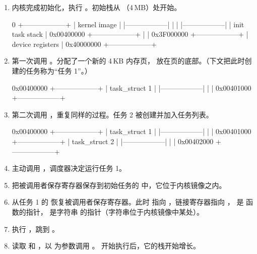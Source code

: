 \begin{enumerate}
  \item 内核完成初始化，执行 。初始栈从 （4\,MB）处开始。
\begin{txtcode}
         0 +------------------+
           | kernel image     |
           |------------------|
           |                  |
           |------------------|
           | init task stack  |
0x00400000 +------------------+
           |                  |
0x3F000000 +------------------+
           | device registers |
0x40000000 +------------------+
\end{txtcode}
  \item {} 第一次调用 。分配了一个新的 4\,KB 内存页， 放在页的底部。（下文把此时创建的任务称为“任务 1”。）
\begin{txtcode}
0x00400000 +------------------+
           | task_struct 1    |
           |------------------|
           |                  |
0x00401000 +------------------+
\end{txtcode}
  \item {} 第二次调用 ，重复同样的过程。任务 2 被创建并加入任务列表。
\begin{txtcode}
0x00400000 +------------------+
           | task_struct 1    |
           |------------------|
           |                  |
0x00401000 +------------------+
           | task_struct 2    |
           |------------------|
           |                  |
0x00402000 +------------------+
\end{txtcode}
  \item {} 主动调用 ，调度器决定运行任务 1。
  \item {} 把被调用者保存寄存器保存到初始任务的  中，它位于内核镜像之内。
  \item {} 从任务 1 的  恢复被调用者保存寄存器。此时  指向 ，链接寄存器指向 ， 是  函数的指针， 是字符串  的指针（字符串位于内核镜像中某处）。
  \item {} 执行 ，跳到 。
  \item {} 读取  和 ，以  为参数调用 。 开始执行后，它的栈开始增长。
\begin{txtcode}

\end{txtcode}
\end{enumerate}
